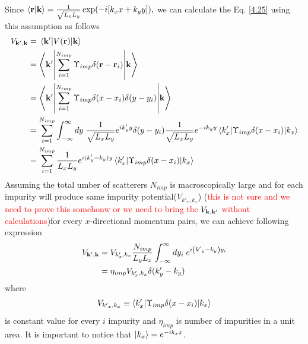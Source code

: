 \noindent
Since $\braket{\mathbf{r}}{\mathbf{k}} = \frac{1}{\sqrt{L_xL_y}} \exp(-i[k_xx + k_yy]),$ we can calculate the Eq. \eqref{4.25} using this assumption as follows
\begin{equation} \label{4.31}
  \begin{aligned}
    V_{\mathbf{k'},\mathbf{k}}
    & = \mel{\mathbf{k'}}{V(\mathbf{r})}{\mathbf{k}} \\
    & = \mel**{\mathbf{k'}}{\sum_{i=1}^{N_{imp}}
    \Upsilon_{imp} \delta(\mathbf{r}-\mathbf{r}_i)}{\mathbf{k}} \\
    & = \mel**{\mathbf{k'}}{\sum_{i=1}^{N_{imp}}
    \Upsilon_{imp} \delta(x-x_i)\delta(y-y_i)}{\mathbf{k}} \\
    & =
    \sum_{i=1}^{N_{imp}}
    \int_{-\infty}^{\infty} dy\;
    \frac{1}{\sqrt{L_xL_y}} e^{ik'_y y} \delta(y-y_i) \frac{1}{\sqrt{L_xL_y}} e^{-i{k}_y y}
    \mel**{k'_x}{\Upsilon_{imp} \delta(x-x_i)}{k_x} \\
    &=
    \sum_{i=1}^{N_{imp}} \frac{1}{{L_xL_y}}
    e^{i(k'_y - k_y )y}
    \mel**{k'_x}{\Upsilon_{imp} \delta(x-x_i)}{k_x}
  \end{aligned}
\end{equation}
Assuming the total  umber of scatterers $N_{imp}$ is macroscopically large and for each impurity will produce same impurity potential($V_{k'_x,k_x}$) (\textcolor{red}{this is not sure and we need to prove this somehonw or we need to bring the $V_{\mathbf{k},\mathbf{k'}}$ without calculations})for every $x$-directional momentum pairs, we can achieve following expression
\begin{equation} \label{4.32}
  \begin{aligned}
    V_{\mathbf{k'},\mathbf{k}}
    & =
    V_{k'_x,k_x}
    \frac{N_{imp}}{L_y L_x} \int_{-\infty}^{\infty} dy_i\;
    e^{i\qty({k'}_y - k_y)y_i} \\
    & =
    \eta_{imp} V_{k'_x,k_x} \delta(k'_y - k_y)
  \end{aligned}
\end{equation}
where
\begin{equation} \label{4.33}
  V_{{k'}_x,k_x} \equiv
  \mel**{k'_x}{\Upsilon_{imp} \delta(x-x_i)}{k_x}
\end{equation}
is constant value for every $i$ impurity and $\eta_{imp}$ is number of impurities in a unit area. It is important to notice that $\ket{k_x} = e^{-ik_xx}$.\\

